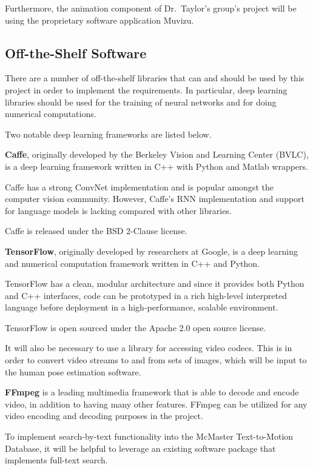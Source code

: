 \documentclass{scrreprt}
\begin{document}
Furthermore, the animation component of Dr.\ Taylor's group's project will be
using the proprietary software application Muvizu.

\subsection{Off-the-Shelf Software}

There are a number of off-the-shelf libraries that can and should be used by
this project in order to implement the requirements. In particular, deep
learning libraries should be used for the training of neural networks and for
doing numerical computations.

Two notable deep learning frameworks are listed below.

\textbf{Caffe}, originally developed by the Berkeley Vision and Learning Center
(BVLC),  is a deep learning framework written in C++ with Python and Matlab
wrappers.

Caffe has a strong ConvNet implementation and is popular amongst the
computer vision community. However, Caffe's RNN implementation and support for
language models is lacking compared with other libraries.

Caffe is released under the BSD 2-Clause license.

\textbf{TensorFlow}, originally developed by researchers at Google, is a deep
learning and numerical computation framework written in C++ and Python.

TensorFlow has a clean, modular architecture and since it provides both Python
and C++ interfaces, code can be prototyped in a rich high-level interpreted
language before deployment in a high-performance, scalable environment.

TensorFlow is open sourced under the Apache 2.0 open source license.

It will also be necessary to use a library for accessing video codecs. This is
in order to convert video streams to and from sets of images, which will be
input to the human pose estimation software.

\textbf{FFmpeg} is a leading multimedia framework that is able to decode and
encode video, in addition to having many other features. FFmpeg can be utilized
for any video encoding and decoding purposes in the project.

To implement search-by-text functionality into the McMaster Text-to-Motion
Database, it will be helpful to leverage an existing software package that
implements full-text search.
\end{document}
